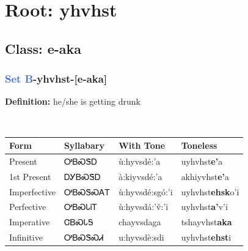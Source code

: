 \needspace{4in}
\section*{Root: yhvhst}
\nopagebreak
{}
\needspace{3in}
\subsection*{Class: e-aka}
\nopagebreak
\needspace{2in}
\subsubsection*{\textcolor{RoyalBlue}{Set B}{-}\textbf{yhvhst}{-}[e-aka]}
\nopagebreak
\textbf{Definition: } he/she is getting drunk
\\[0.5em]
\begin{tabularx}{\textwidth}{l X X X}%
\toprule%
\textbf{Form}&\textbf{Syllabary}&\textbf{With Tone}&\textbf{Toneless}\\%
\midrule%
Present&ᎤᏴᏍᏕᎠ&ù:hyvsdé:’a&uyhvhst\textbf{e'}a\\%
1st Present&ᎠᎩᏴᏍᏕᎠ&à:kiyvsdé:’a&akhiyvhst\textbf{e'}a\\%
Imperfective&ᎤᏴᏍᏕᏍᎪᎢ&ù:hyvsdé:sgó:’i&uyhvhst\textbf{ehsk}o'i\\%
Perfective&ᎤᏴᏍᏓᎥᎢ&ù:hyvsdá:’v̌:’i&uyhvhst\textbf{a'}v'i\\%
Imperative&ᏣᏴᏍᏓᎦ&chayvsdaga&tshayvhst\textbf{aka}\\%
Infinitive&ᎤᏴᏍᏕᏍᏗ&u:hyvsdè:sdi&uyhvhst\textbf{ehst}i\\%
\bottomrule%
\end{tabularx}
\\[1em]